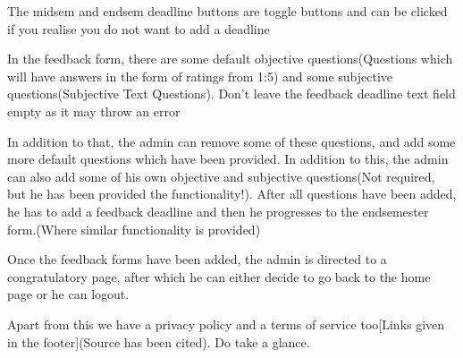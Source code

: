 \documentclass[11pt]{report}
\begin{document}
\begin{outline}
\begin{outline}
		\item The midsem and endsem deadline buttons are toggle buttons and can be clicked if you realise you do not want to add a deadline
		\item In the feedback form, there are some default objective questions(Questions which will have answers in the form of ratings from 1:5) and some subjective questions(Subjective Text Questions). 
Don't leave the feedback deadline text field empty as it may throw an error
		\item In addition to that, the admin can remove some of these questions, and add some more default questions which have been provided. In addition to this, the admin can also add some of his own objective and subjective questions(Not required, but he has been provided the functionality!). After all questions have been added, he has to add a feedback deadline and then he progresses to the endsemester form.(Where similar functionality is provided)
		\item Once the feedback forms have been added, the admin is directed to a congratulatory page, after which he can either decide to go back to the home page or he can logout.
		\item Apart from this we have a privacy policy and a terms of service too[Links given in the footer](Source has been cited). Do take a glance.
	\end{outline}
\end{outline}
\end{document}
